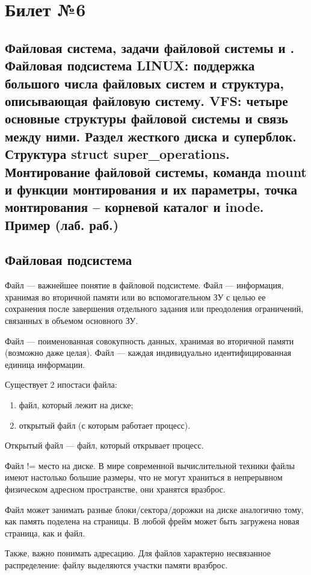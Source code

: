 \chapter{Билет №6}

\section*{Файловая система, задачи файловой системы и . Файловая подсистема LINUX: поддержка большого числа файловых систем и структура, описывающая файловую систему. VFS: четыре основные структуры файловой системы и связь между ними. Раздел жесткого диска и суперблок. Структура struct super\_operations. Монтирование файловой системы, команда mount и функции монтирования и их параметры, точка монтирования – корневой каталог и inode. Пример (лаб. раб.)}

\section{Файловая подсистема}
Файл --- важнейшее понятие в файловой подсистеме. Файл --- информация, хранимая во вторичной памяти или во вспомогательном ЗУ с целью ее сохранения после завершения отдельного задания или преодоления ограничений, связанных в объемом основного ЗУ.

Файл --- поименованная совокупность данных, хранимая во вторичной памяти (возможно даже целая). Файл --- каждая индивидуально идентифицированная единица информации.

Существует 2 ипостаси файла:
\begin{enumerate}
	\item файл, который лежит на диске;
	\item открытый файл (с которым работает процесс).
\end{enumerate}

Открытый файл --- файл, который открывает процесс.

Файл != место на диске. В мире современной вычислительной техники файлы имеют настолько большие размеры, что не могут храниться в непрерывном физическом адресном пространстве, они хранятся вразброс.

Файл может занимать разные блоки/сектора/дорожки на диске аналогично тому, как память поделена на страницы. В любой фрейм может быть загружена новая страница, как и файл. 

Также, важно понимать адресацию. Для файлов характерно несвязанное распределение: файлу выделяются участки памяти вразброс.

